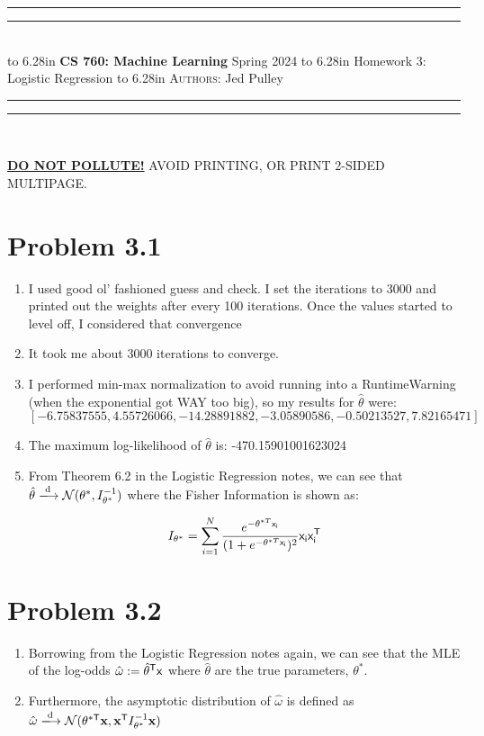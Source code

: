 \documentclass{article}
\newcommand{\lecture}[2]{
\pagestyle{myheadings}
\thispagestyle{plain}
\newpage
\noindent
\begin{center}
\rule{\textwidth}{1.6pt}\vspace*{-\baselineskip}\vspace*{2pt} %
\rule{\textwidth}{0.4pt}\\[1\baselineskip] %
\vbox{\vspace{2mm}
\hbox to 6.28in { {\bf CS 760: Machine Learning} \hfill Spring 2024 }
\vspace{4mm}
\hbox to 6.28in { {\Large \hfill #1  \hfill} }
\vspace{4mm}
\hbox to 6.28in { {\scshape Authors:}  #2 \hfill }}
\vspace{-2mm}
\rule{\textwidth}{0.4pt}\vspace*{-\baselineskip}\vspace{3.2pt} %
\rule{\textwidth}{1.6pt}\\[\baselineskip] %
\end{center}
\vspace*{4mm}
}
\begin{document}
\lecture{Homework 3: Logistic Regression}{Jed Pulley}

\begin{center}
{\Large {\sf \underline{\textbf{DO NOT POLLUTE!}} AVOID PRINTING, OR PRINT 2-SIDED MULTIPAGE.}}
\end{center}

\section*{Problem 3.1}
\begin{enumerate}[label=(\alph*)]
  \item I used good ol' fashioned guess and check. I set the iterations to 3000 and printed out the weights after every 100 iterations. Once the values started to level off, I considered that convergence
  \item It took me about 3000 iterations to converge.
  \item I performed min-max normalization to avoid running into a RuntimeWarning (when the exponential got WAY too big), so my results for $\hat{\theta}$ were: \[[-6.75837555, 4.55726066, -14.28891882, -3.05890586, -0.50213527, 7.82165471]\]
  \item The maximum log-likelihood of $\hat{\theta}$ is: -470.15901001623024
  \item From Theorem 6.2 in the Logistic Regression notes, we can see that $\hat{\theta} \xlongrightarrow[\text{}]{\text{d}} \mathcal{N}(\theta^*, I^{-1}_{\theta^*})$ where the Fisher Information is shown as: \[I_{\theta^*} = \sum_{i=1}^{N}\frac{e^{-\theta^{*T}\sf{x}_i}}{(1 + e^{-\theta^{*T}\sf{x}_i})^2}\sf{x}_i\sf{x}^{\sf{T}}_i\]
\end{enumerate}

\section*{Problem 3.2}
\begin{enumerate}[label=(\alph*)]
  \item Borrowing from the Logistic Regression notes again, we can see that the MLE of the log-odds $\hat{\omega} := \hat{\theta}^{\sf{T}}\sf{x}$ where $\hat{\theta}$ are the true parameters, $\theta^*$.
  \item Furthermore, the asymptotic distribution of $\hat{\omega}$ is defined as $\hat{\omega} \xlongrightarrow[\text{}]{\text{d}} \mathcal{N}(\theta^{*\sf{T}}\textbf{x}, \textbf{x}^{\sf{T}}I^{-1}_{\theta^*}\textbf{x})$
\end{enumerate}
\end{document}
